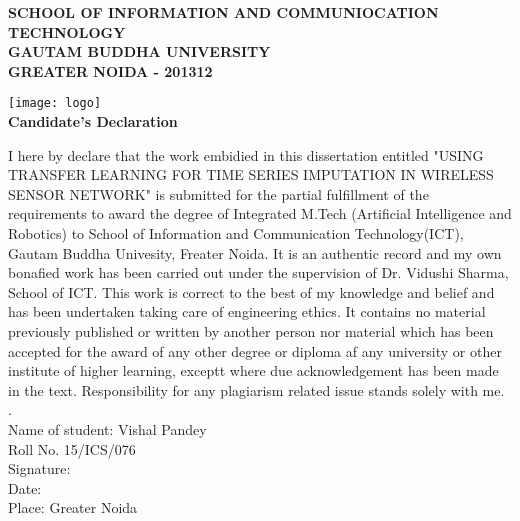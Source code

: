 \thispagestyle{plain}
\begin{center}

	\normalsize
	\textbf{SCHOOL OF INFORMATION AND COMMUNIOCATION TECHNOLOGY}\\
	\textbf{GAUTAM BUDDHA UNIVERSITY}\\
	\textbf{GREATER NOIDA - 201312}

	\vspace{0.5cm}

	\texttt{[image: logo]}\\
	\Large
	\textbf{Candidate's Declaration}

\end{center}

\normalsize
I here by declare that the work embidied in this dissertation entitled "USING TRANSFER LEARNING FOR TIME SERIES IMPUTATION IN WIRELESS SENSOR NETWORK" is submitted for the partial fulfillment of the requirements to award the degree of Integrated M.Tech (Artificial Intelligence and Robotics) to School of Information and Communication Technology(ICT), Gautam Buddha Univesity, Freater Noida. It is an authentic record and my own bonafied work has been carried out under the supervision of Dr. Vidushi Sharma, School of ICT. This work is correct to the best of my knowledge and belief and has been undertaken taking care of engineering ethics. It contains no material previously published or written by another person nor material which has been accepted for the award of any other degree or diploma af any university or other institute of higher learning, exceptt where due acknowledgement has been made in the text. Responsibility for any plagiarism related issue stands solely with me.\\

.\\
Name of student: Vishal Pandey\\
Roll No. 15/ICS/076\\
Signature:\\
Date: \\
Place: Greater Noida\\
